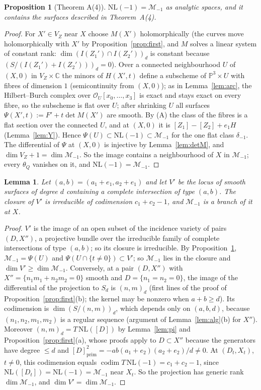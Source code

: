 \documentclass[11pt]{article}
\numberwithin{equation}{section}
\newtheorem{proposition}[theorem]{Proposition}
\newtheorem{lemma}[theorem]{Lemma}
\theoremstyle{remark}
\newcommand{\PP}{\mathbb{P}}
\newcommand{\CC}{\mathbb{C}}
\newcommand{\NL}{\mathrm{NL}}
\newcommand{\VZ}{V_Z}
\newcommand{\cM}{\mathcal{M}}
\newcommand{\codim}{\operatorname{codim}}
\begin{document}
\begin{proposition}[Theorem A(4)]\label{prop:minus1}
$\NL(-1)=\cM_{-1}$ as analytic spaces, and it contains the surfaces described in Theorem~\textup{A(4)}.
\end{proposition}
\begin{proof}
For $X'\in\VZ$ near $X$ choose $M(X')$ holomorphically (the curves move holomorphically with $X'$ by
Proposition~\ref{prop:first}, and $M$ solves a linear system of constant rank: $\dim(I(Z_1')\cap I(Z_2'))_d$ is
constant because $(S/(I(Z_1')+I(Z_2')))_d=0$). Over a connected neighbourhood $U$ of $(X,0)$ in $\VZ\times\CC$
the minors of $H(X',t)$ define a subscheme of $\PP^3\times U$ with fibres of dimension $1$ (semicontinuity from
$(X,0)$); as in Lemma~\ref{lem:arc}, the Hilbert--Burch complex over $\mathcal O_U[x_0,\dots,x_3]$ is exact and
stays exact on every fibre, so the subscheme is flat over $U$; after shrinking $U$ all surfaces
$\Psi(X',t):=F'+t\det M(X')$ are smooth. By (A) the class of the fibres is a flat section over the connected
$U$, and at $(X,0)$ it is $[Z_1]-[Z_2]+e_1H$ (Lemma~\ref{lem:Y}). Hence $\Psi(U)\subset\NL(-1)\subset\cM_{-1}$ for the one
flat class $\delta_{-1}$. The differential of $\Psi$ at $(X,0)$ is injective by Lemma~\ref{lem:detM}, and
$\dim\VZ+1=\dim\cM_{-1}$. So the image contains a neighbourhood of $X$ in $\cM_{-1}$; every $\theta_Q$ vanishes
on it, and $\NL(-1)=\cM_{-1}$.
\end{proof}

\begin{lemma}\label{lem:branch}
Let $(a,b)=(a_1+e_1,a_2+e_1)$ and let $V'$ be the locus of smooth surfaces of degree $d$ containing a complete
intersection of type $(a,b)$. The closure of $V'$ is irreducible of codimension $c_1+c_2-1$, and $\cM_{-1}$ is a
branch of it at $X$.
\end{lemma}
\begin{proof}
$V'$ is the image of an open subset of the incidence variety of pairs $(D,X'')$, a projective bundle over the
irreducible family of complete intersections of type $(a,b)$; so its closure is irreducible. By
Proposition~\ref{prop:minus1}, $\cM_{-1}=\Psi(U)$ and $\Psi(U\cap\{t\neq0\})\subset V'$; so $\cM_{-1}$ lies in the
closure and $\dim V'\ge\dim\cM_{-1}$. Conversely, at a pair $(D,X'')$ with $X''=\{n_1m_1+n_2m_2=0\}$ smooth and
$D=\{n_1=n_2=0\}$, the image of the differential of the projection to $S_d$ is $(n,m)_d$ (first lines of the
proof of Proposition~\ref{prop:first}(b); the kernel may be nonzero when $a+b\ge d$). Its codimension is
$\dim(S/(n,m))_d$, which depends only on $(a,b,d)$, because $(n_1,n_2,m_1,m_2)$ is a regular sequence (argument
of Lemma~\ref{lem:alg}(b) for $X''$). Moreover $(n,m)_d=T\,\NL([D])$ by Lemma~\ref{lem:pi} and
Proposition~\ref{prop:first}(a), whose proofs apply to $D\subset X''$ because the generators have degree $\le d$
and $[D]^2_{\mathrm{prim}}=-ab(a_1+e_2)(a_2+e_2)/d\ne0$. At $(D_t,X_t)$,
$t\ne0$, this codimension equals $\codim T\,\NL(-1)=c_1+c_2-1$, since $\NL([D_t])=\NL(-1)=\cM_{-1}$ near $X_t$. So the
projection has generic rank $\dim\cM_{-1}$, and $\dim V'=\dim\cM_{-1}$.
\end{proof}
\end{document}
